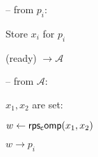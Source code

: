 \begin{bbox}[title={\textbf{Functionality} $\F_{\msf{RPS}}$}]

-- \OnInput {} from $p_i$:

	\qquad Store $x_i$ for $p_i$

	\qquad \Send (ready) $\rightarrow \mathcal{A}$

-- \OnInput {} from $\mathcal{A}$:

	\qquad \If $x_1,x_2$ are set:

		\qqquad $w \leftarrow {\mathsf {rps_comp}}(x_1,x_2)$

		\qqquad  \Send $w \rightarrow p_i$

\end{bbox}
